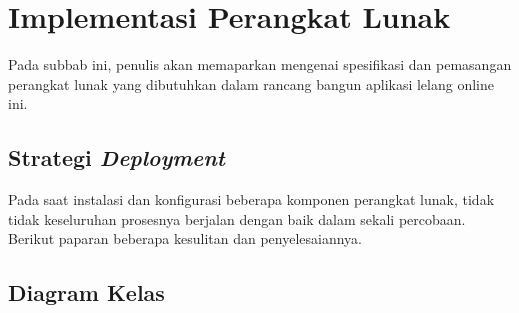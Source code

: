 
\section{Implementasi Perangkat Lunak}
Pada subbab ini, penulis akan memaparkan mengenai spesifikasi dan pemasangan perangkat lunak yang dibutuhkan dalam rancang bangun aplikasi lelang online ini.
  
  
\subsection{Strategi \textit{Deployment}}
Pada saat instalasi dan konfigurasi beberapa komponen perangkat lunak, tidak tidak keseluruhan prosesnya berjalan dengan baik dalam sekali percobaan. Berikut paparan beberapa kesulitan dan penyelesaiannya.
	  
	
	
	
	
\subsection{Diagram Kelas}
	 
  
  
  
  
  
  

